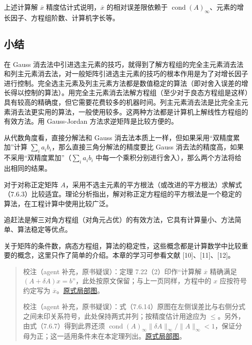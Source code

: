 \documentclass[
  10pt,
  fontset=fandol]{ctexart}
\begin{document}
上述计算解 \(\overline x\) 精度估计式说明，\(\overline x\)
的相对误差限依赖于
\(\operatorname{cond}(A)_\infty\)、元素的增长因子、方程组阶数、计算机字长等。

\subsection{小结}\label{ux5c0fux7ed3}

在 Gauss
消去法中引进选主元素的技巧，就得到了解方程组的完全主元素消去法和列主元素消去法，对一般矩阵引进选主元素的技巧的根本作用是为了对增长因子进行控制。完全选主元素及列主元素方法都是数值稳定的算法（即对舍入误差的增长得以控制的算法）。用完全主元素消去法解方程组（至少对于良态方程组是这样）具有较高的精确度，但它需要花费较多的机器时间。列主元素消去法是比完全主元素消去法更实用的算法，一般使用较多。这两种方法都是计算机上解线性方程组的有效方法。用
Gauss-Jordan 方法求逆矩阵是比较方便的。

从代数角度看，直接分解法和 Gauss
消去法本质上一样，但如果采用``双精度累加''计算
\(\sum_i a_ib_i\)，那么直接三角分解法的精度要比 Gauss
消去法的精度高，如果不采用``双精度累加''（\(\sum_i a_ib_i\)
中每一个乘积分别进行舍入），那么两个方法将给出相同的结果。

对于对称正定矩阵
\(A\)，采用不选主元素的平方根法（或改进的平方根法）求解式（7.6.3）比较适宜。理论分析指出，解对称正定方程组的平方根法是一个稳定的算法，在工程计算中使用比较广泛。

追赶法是解三对角方程组（对角元占优）的有效方法，它具有计算量小、方法简单、算法稳定等优点。

关于矩阵的条件数，病态方程组，算法的稳定性，这些概念都是计算数学中比较重要的概念，这里只作了简单的介绍。本章的学习可参看文献
{[}10{]}、{[}11{]}、{[}12{]}。

\begin{quote}
校注（agent 补充，原书疑误）：定理 7.22（2）印作``计算解 \(\overline x\)
精确满足 \((A+\delta A)x=b\)''，此处按原文保留；与上一页同样，方程中的
\(x\) 应按符号约定写为
\(\overline x\)。\href{../../../staging/ch07b/assets/211-computed-solution.png}{原式局部图}。

校注（agent
补充，原书疑误）：式（7.6.14）原图在左侧误差比与右侧分式之间未印关系符号，此处保持两式并列；按精度估计用途应为
\(\leqslant\)。另外，由式（7.6.7）得到此界还须
\(\operatorname{cond}(A)_\infty\|\delta A\|_\infty/\|A\|_\infty<1\)，保证分母为正；这一适用条件未在本定理列出。\href{../../../staging/ch07b/assets/211-error-estimate.png}{原式局部图}。
\end{quote}
\end{document}
